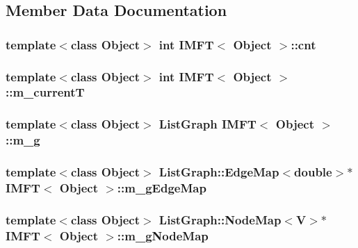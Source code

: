 \subsection{\-Member \-Data \-Documentation}
\hypertarget{class_i_m_f_t_aa470d46dee0f624f461d8854939cd6c5}{
\subsubsection[{cnt}]{\setlength{\rightskip}{0pt plus 5cm}template$<$class \-Object$>$ int {\bf \-I\-M\-F\-T}$<$ \-Object $>$\-::{\bf cnt}}}\label{class_i_m_f_t_aa470d46dee0f624f461d8854939cd6c5}
\hypertarget{class_i_m_f_t_afd30e2f7af8158e10d95c1e55a05e17d}{
\subsubsection[{m\-\_\-current\-T}]{\setlength{\rightskip}{0pt plus 5cm}template$<$class \-Object$>$ int {\bf \-I\-M\-F\-T}$<$ \-Object $>$\-::{\bf m\-\_\-current\-T}}}\label{class_i_m_f_t_afd30e2f7af8158e10d95c1e55a05e17d}
\hypertarget{class_i_m_f_t_a03887af2ae2372fcbecc2525176bbef8}{
\subsubsection[{m\-\_\-g}]{\setlength{\rightskip}{0pt plus 5cm}template$<$class \-Object$>$ \-List\-Graph {\bf \-I\-M\-F\-T}$<$ \-Object $>$\-::{\bf m\-\_\-g}}}\label{class_i_m_f_t_a03887af2ae2372fcbecc2525176bbef8}
\hypertarget{class_i_m_f_t_a9629eb1da0d08013c87c4e679c176c6b}{
\subsubsection[{m\-\_\-g\-Edge\-Map}]{\setlength{\rightskip}{0pt plus 5cm}template$<$class \-Object$>$ \-List\-Graph\-::\-Edge\-Map$<$double$>$$\ast$ {\bf \-I\-M\-F\-T}$<$ \-Object $>$\-::{\bf m\-\_\-g\-Edge\-Map}}}\label{class_i_m_f_t_a9629eb1da0d08013c87c4e679c176c6b}
\hypertarget{class_i_m_f_t_a456c4e69b77870a87f0d6a86b33ce668}{
\subsubsection[{m\-\_\-g\-Node\-Map}]{\setlength{\rightskip}{0pt plus 5cm}template$<$class \-Object$>$ \-List\-Graph\-::\-Node\-Map$<${\bf \-V}$>$$\ast$ {\bf \-I\-M\-F\-T}$<$ \-Object $>$\-::{\bf m\-\_\-g\-Node\-Map}}}\label{class_i_m_f_t_a456c4e69b77870a87f0d6a86b33ce668}
